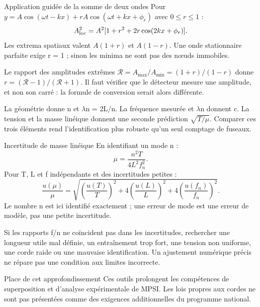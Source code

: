 \begin{loi}{Application guidée de la somme de deux ondes}
Pour $y=A\cos(\omega t-kx)+rA\cos(\omega t+kx+\phi_r)$ avec $0\leq r\leq1$ :\[A_{\rm loc}^2=A^2[1+r^2+2r\cos(2kx+\phi_r)].\]Les extrema spatiaux valent $A(1+r)$ et $A(1-r)$. Une onde stationnaire parfaite exige r = 1 ; sinon les minima ne sont pas des nœuds immobiles.
\end{loi}
Le rapport des amplitudes extrêmes $\mathcal R=A_{\max}/A_{\min}=(1+r)/(1-r)$ donne $r=(\mathcal R-1)/(\mathcal R+1)$. Il faut vérifier que le détecteur mesure une amplitude, et non son carré : la formule de conversion serait alors différente.


La géométrie donne n et \ensuremath{\lambda}n = 2L/n. La fréquence mesurée et \ensuremath{\lambda}n donnent c. La tension et la masse linéique donnent une seconde prédiction $\sqrt{T/\mu}$. Comparer ces trois éléments rend l’identification plus robuste qu’un seul comptage de fuseaux.
\begin{loi}{Incertitude de masse linéique}
En identifiant un mode n :\[\mu=\frac{n^2T}{4L^2f_n^2}.\]Pour T, L et f indépendants et des incertitudes petites :\[\frac{u(\mu)}\mu=\sqrt{\left(\frac{u(T)}T\right)^2+4\left(\frac{u(L)}L\right)^2+4\left(\frac{u(f_n)}{f_n}\right)^2}.\]Le nombre n est ici identifié exactement ; une erreur de mode est une erreur de modèle, pas une petite incertitude.
\end{loi}
Si les rapports f/n ne coïncident pas dans les incertitudes, rechercher une longueur utile mal définie, un entraînement trop fort, une tension non uniforme, une corde raide ou une mauvaise identification. Un ajustement numérique précis ne répare pas une condition aux limites incorrecte.
\begin{docu}{Place de cet approfondissement}
Ces outils prolongent les compétences de superposition et d’analyse expérimentale de MPSI. Les lois propres aux cordes ne sont pas présentées comme des exigences additionnelles du programme national.
\end{docu}


